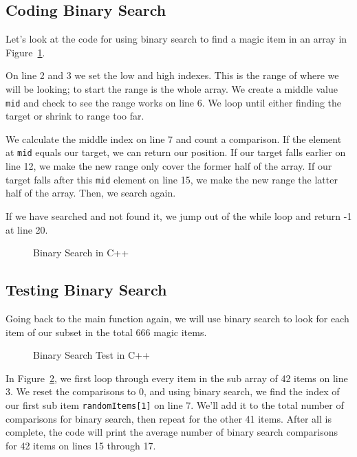 \documentclass[letterpaper, 10pt,DIV=13]{scrartcl}
\numberwithin{equation}{section} %
\numberwithin{figure}{section} %
\numberwithin{table}{section} %
\begin{document}
\subsection{Coding Binary Search}
Let's look at the code for using binary search to find a magic item in an array in Figure~\ref{figure:BinarySearch}.

On line 2 and 3 we set the low and high indexes. This is the range of where we will be looking; to start the range is the whole array. We create a middle value \texttt{mid} and check to see the range works on line 6. We loop until either finding the target or shrink to range too far.

We calculate the middle index on line 7 and count a comparison. If the element at \texttt{mid} equals our target, we can return our position. If our target falls earlier on line 12, we make the new range only cover the former half of the array. If our target falls after this \texttt{mid} element on line 15, we make the new range the latter half of the array. Then, we search again.

If we have searched and not found it, we jump out of the while loop and return -1 at line 20.

\pagebreak

\begin{figure}[ht] 
    \centering 
    
    \caption{Binary Search in C++}
    \label{figure:BinarySearch}
\end{figure}


\subsection{Testing Binary Search}
Going back to the main function again, we will use binary search to look for each item of our subset in the total 666 magic items.

\begin{figure}[ht] 
    \centering 
    
    \caption{Binary Search Test in C++}
    \label{figure:BinaryTest}
\end{figure}

In Figure~\ref{figure:BinaryTest}, we first loop through every item in the sub array of 42 items on line 3. We reset the comparisons to 0, and using binary search, we find the index of our first sub item \texttt{randomItems[1]} on line 7. We'll add it to the total number of comparisons for binary search, then repeat for the other 41 items. After all is complete, the code will print the average number of binary search comparisons for 42 items on lines 15 through 17.
\end{document}
